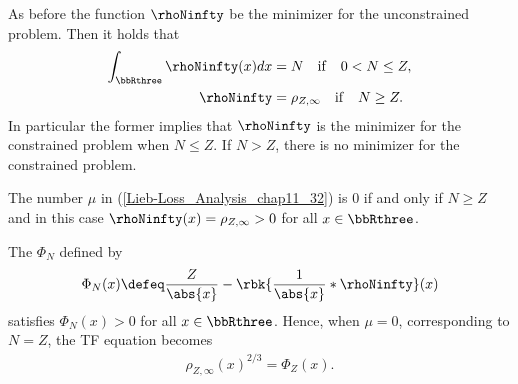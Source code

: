 \documentclass[openany, a4paper, oneside]{jsbook}
\begin{document}
\begin{thm}
 As before the function $\rhoNinfty$ be the minimizer for the unconstrained problem.
 Then it holds that
 \begin{align}
  \int_{\bbRthree} \rhoNinfty (x) dx
  &=
  N \quad \mathrm{if} \quad 0 < N \leq Z, \\
  \rhoNinfty
  &=
  \rho_{Z, \infty} \quad \mathrm{if} \quad N \geq Z.
 \end{align}
 In particular the former implies that $\rhoNinfty$ is the minimizer for the constrained problem when $N \leq Z$.
 If $N > Z$, there is no minimizer for the constrained problem.

 The number $\mu$ in \textup{(\ref{Lieb-Loss_Analysis_chap11_32})} is $0$ if and only if $N \geq Z$ and in this case
 $\rhoNinfty (x) = \rho_{Z, \infty} > 0$ for all $x \in \bbRthree$.

 The  $\Phi_N$ defined by
 \begin{align}
  \Phi_N (x)
  \defeq
  \frac{Z}{\abs{x}} - \rbk{\frac{1}{\abs{x}} * \rhoNinfty} (x)
 \end{align}
 satisfies $\Phi_N (x) > 0$ for all $x \in \bbRthree$.
 Hence, when $\mu = 0$, corresponding to $N = Z$, the TF equation becomes
 \begin{align}
  \rho_{Z, \infty} (x)^{2/3}
  =
  \Phi_Z (x). \label{Lieb-Loss_Analysis_chap11_35}
 \end{align}
\end{thm}
\end{document}
